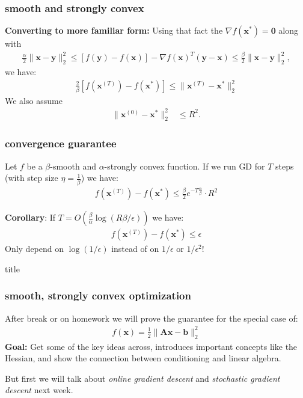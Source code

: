 \documentclass[compress]{beamer}
\newcommand{\bv}[1]{\mathbf{#1}}
\begin{document}
\begin{frame}[t]
	\frametitle{smooth and strongly convex}
	\textbf{Converting to more familiar form:}
	Using that fact the $\nabla f(\bv{x}^*) = \bv{0}$ along with
	\begin{align*}
		{\frac{\alpha}{2}}\|\bv{x} - \bv{y}\|_2^2 \leq  \left[f(\bv{y}) - f(\bv{x})\right] - \nabla f(\bv{x})^T(\bv{y} - \bv{x}) \leq {\frac{\beta}{2}}\|\bv{x} - \bv{y}\|_2^2, 
	\end{align*}
	we have:
	\begin{align*}
		\frac{2}{\beta} \left[f(\bv{x}^{(T)}) - f(\bv{x}^*)\right] \leq \|\bv{x}^{(T)} - \bv{x}^*\|_2^2  
	\end{align*}	
We also assume
\begin{align*}
			\|\bv{x}^{(0)} - \bv{x}^*\|_2^2 &\leq R^2.
\end{align*}
\end{frame}

\begin{frame}[t]
	\frametitle{convergence guarantee}
	\begin{corollary}
		Let $f$ be a $\beta$-smooth and $\alpha$-strongly convex function. If we run GD for $T$ steps (with step size $\eta = \frac{1}{\beta}$) we have:
		\begin{align*}
			f(\bv{x}^{(T)}) - f(\bv{x}^*)  \leq \frac{\beta}{2} e^{-T\frac{\alpha}{\beta}} \cdot  R^2
		\end{align*} 
	\end{corollary}	
	\textbf{Corollary}: 
	If \alert{$T = O\left(\frac{\beta}{\alpha}\log(R\beta/\epsilon)\right)$} we have:
	\begin{align*}
		f({\bv{x}}^{(T)}) - f(\bv{x}^*) \leq \epsilon
	\end{align*}
	Only depend on $\log(1/\epsilon)$ instead of on $1/\epsilon$ or $1/\epsilon^2$!
\end{frame}

\begin{frame}{title}
	\frametitle{smooth, strongly convex optimization}
	After break or on homework we will prove the guarantee for the special case of:
	\begin{align*}
		f(\bv{x}) = \frac{1}{2}\|\bv{A}\bv{x} - \bv{b}\|_2^2
	\end{align*}
	\textbf{Goal:} Get some of the key ideas across, introduces important concepts like the Hessian, and show the connection between conditioning and linear algebra.
	
	\begin{center}
	\alert{But first we will talk about \emph{online gradient descent} and \emph{stochastic gradient descent} next week.}
	\end{center}
\end{frame}
\end{document}

